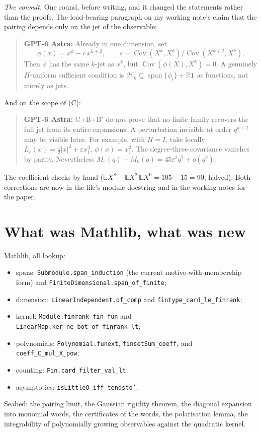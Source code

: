 \documentclass[11pt]{article}
\newcommand{\R}{\mathbb{R}}
\newcommand{\code}[1]{\texttt{#1}}
\newcommand{\Cov}{\operatorname{Cov}}
\newcommand{\gptbox}[1]{\par\medskip\begin{quote}\small\textbf{\textcolor{green!50!black}{GPT-6 Astra:}} #1\end{quote}\medskip}
\begin{document}
\emph{The consult.} One round, before writing, and it changed the
statements rather than the proofs. The load-bearing paragraph on my
working note's claim that the pairing depends only on the jet of the
observable:
\gptbox{Already in one dimension, set
\[\phi(x) = x^k - c\,x^{k+2}, \qquad c = \Cov(X^k, X^k)/\Cov(X^{k+2}, X^k).\]
Then $\phi$ has the same
$k$-jet as $x^k$, but $\Cov(\phi(X), X^k) = 0$. A genuinely $H$-uniform
sufficient condition is $\mathcal H_k \subseteq \operatorname{span}\{\phi_i\}
+ \R\mathbf 1$ as functions, not merely as jets.}
And on the scope of (C):
\gptbox{C+B+B$'$ do not prove that no finite family recovers the full
jet from its entire expansions. A perturbation invisible at order
$q^{k-2}$ may be visible later. For example, with $H = I$, take locally
$L_\varepsilon(x) = \tfrac12|x|^2 + \varepsilon x_1^3$, $\phi(x) =
x_1^2$. The degree-three covariance vanishes by parity. Nevertheless
$M_\varepsilon(q) - M_0(q) = 45\varepsilon^2 q^2 + o(q^2)$.}
The coefficient checks by hand ($\mathbb E X^8 - \mathbb E X^2\,
\mathbb E X^6 = 105 - 15 = 90$, halved). Both corrections are now in
the file's module docstring and in the working notes for the paper.

\section{What was Mathlib, what was new}

Mathlib, all lookup:
\begin{itemize}
\item spans: \code{Submodule.span\_induction} (the current
motive-with-membership form) and \code{FiniteDimensional.span\_of\_finite};
\item dimension: \code{LinearIndependent.of\_comp} and
\code{fintype\_card\_le\_finrank};
\item kernel: \code{Module.finrank\_fin\_fun} and
\code{LinearMap.ker\_ne\_bot\_of\_finrank\_lt};
\item polynomials: \code{Polynomial.funext}, \code{finsetSum\_coeff},
and \code{coeff\_C\_mul\_X\_pow};
\item counting: \code{Fin.card\_filter\_val\_lt};
\item asymptotics: \code{isLittleO\_iff\_tendsto'}.
\end{itemize}

Seabed: the pairing limit, the Gaussian rigidity theorem, the diagonal
expansion into monomial words, the certificates of the words, the
polarisation lemma, the integrability of polynomially growing
observables against the quadratic kernel.
\end{document}
